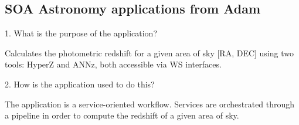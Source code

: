 \documentclass[preprint,12pt]{article}
\begin{document}










\subsection{SOA Astronomy applications from Adam\label{astroSOAAdam}}

1. What is the purpose of the application?

Calculates the photometric redshift for a given area of sky [RA, DEC] using two tools: HyperZ and ANNz, both accessible via WS interfaces.

2. How is the application used to do this?

The application is a service-oriented workflow. Services are orchestrated through a pipeline in order to compute the redshift of a given area of sky.
\end{document}
